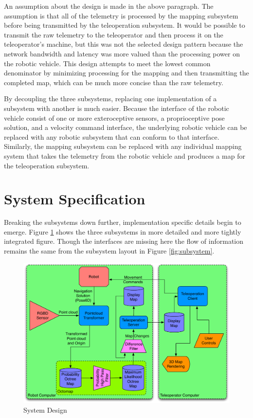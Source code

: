 \documentclass[12pt]{report}
\begin{document}
An assumption about the design is made in the above paragraph.  The assumption is that all of the telemetry is processed by the mapping subsystem before being transmitted by the teleoperation subsystem.  It would be possible to transmit the raw telemetry to the teleoperator and then process it on the teleoperator's machine, but this was not the selected design pattern because the network bandwidth and latency was more valued than the processing power on the robotic vehicle.  This design attempts to meet the lowest common denominator by minimizing processing for the mapping and then transmitting the completed map, which can be much more concise than the raw telemetry.

By decoupling the three subsystems, replacing one implementation of a subsystem with another is much easier.  Because the interface of the robotic vehicle consist of one or more exteroceptive sensors, a proprioceptive pose solution, and a velocity command interface, the underlying robotic vehicle can be replaced with any robotic subsystem that can conform to that interface.  Similarly, the mapping subsystem can be replaced with any individual mapping system that takes the telemetry from the robotic vehicle and produces a map for the teleoperation subsystem.

\section{System Specification}
Breaking the subsystems down further, implementation specific details begin to emerge.  Figure \ref{fig:system_diagram} shows the three subsystems in more detailed and more tightly integrated figure.  Though the interfaces are missing here the flow of information remains the same from the subsystem layout in Figure \ref{fig:subsystem}.

\begin{figure}[ht]
  \centering
  \includegraphics[width=6in,keepaspectratio]{system_diagram.pdf}
  \caption{System Design}
  \label{fig:system_diagram}
\end{figure}
\end{document}
